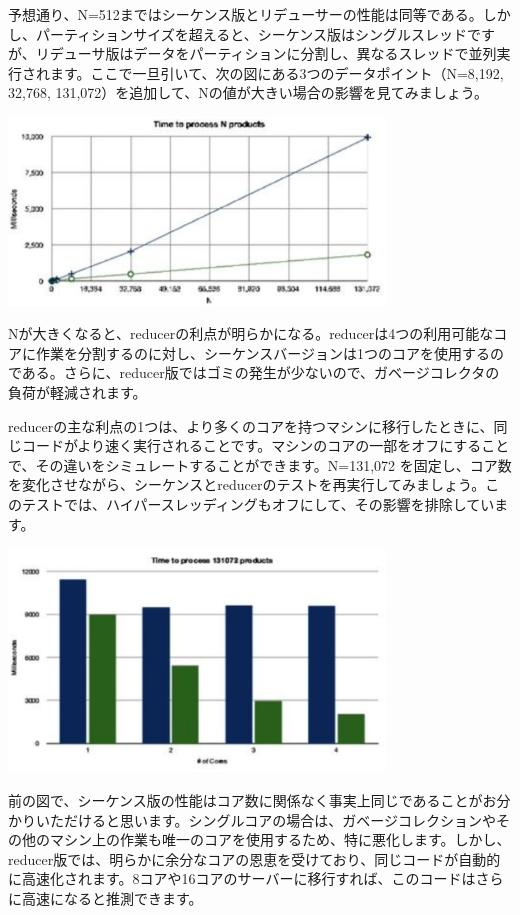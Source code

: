 予想通り、N=512まではシーケンス版とリデューサーの性能は同等である。しかし、パーティションサイズを超えると、シーケンス版はシングルスレッドですが、リデューサ版はデータをパーティションに分割し、異なるスレッドで並列実行されます。ここで一旦引いて、次の図にある3つのデータポイント（N=8,192, 32,768, 131,072）を追加して、Nの値が大きい場合の影響を見てみましょう。

\includegraphics[width=10cm]{fig_05_007.eps}

Nが大きくなると、reducerの利点が明らかになる。reducerは4つの利用可能なコアに作業を分割するのに対し、シーケンスバージョンは1つのコアを使用するのである。さらに、reducer版ではゴミの発生が少ないので、ガベージコレクタの負荷が軽減されます。

reducerの主な利点の1つは、より多くのコアを持つマシンに移行したときに、同じコードがより速く実行されることです。マシンのコアの一部をオフにすることで、その違いをシミュレートすることができます。N=131,072 を固定し、コア数を変化させながら、シーケンスとreducerのテストを再実行してみましょう。このテストでは、ハイパースレッディングもオフにして、その影響を排除しています。

\includegraphics[width=10cm]{fig_05_008.eps}



前の図で、シーケンス版の性能はコア数に関係なく事実上同じであることがお分かりいただけると思います。シングルコアの場合は、ガベージコレクションやその他のマシン上の作業も唯一のコアを使用するため、特に悪化します。しかし、reducer版では、明らかに余分なコアの恩恵を受けており、同じコードが自動的に高速化されます。8コアや16コアのサーバーに移行すれば、このコードはさらに高速になると推測できます。

